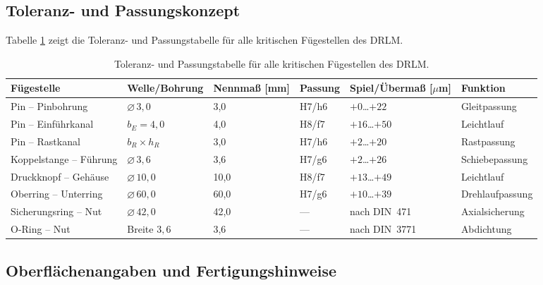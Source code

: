 ﻿\documentclass[12pt, a4paper]{article}
\theoremstyle{remark}
\begin{document}
\subsection{Toleranz- und Passungskonzept}
Tabelle \ref{tab:toleranzen} zeigt die Toleranz- und Passungstabelle für alle kritischen Fügestellen des DRLM.
\begin{table}
  \centering
  \caption{Toleranz- und Passungstabelle für alle kritischen Fügestellen des DRLM.}
  \label{tab:toleranzen}
  \renewcommand{\arraystretch}{1.35}
  \begin{tabular}{llllll}
    \toprule
    \textbf{Fügestelle} & \textbf{Welle/Bohrung} & \textbf{Nennmaß [mm]} &
    \textbf{Passung} & \textbf{Spiel/Übermaß [$\mu$m]} & \textbf{Funktion} \\
    \midrule
    Pin -- Pinbohrung         & $\varnothing\,3{,}0$ & 3{,}0  & H7/h6 & $+0$\ldots$+22$   & Gleitpassung \\
    Pin -- Einführkanal       & $b_E = 4{,}0$        & 4{,}0  & H8/f7 & $+16$\ldots$+50$  & Leichtlauf \\
    Pin -- Rastkanal          & $b_R \times h_R$     & 3{,}0  & H7/h6 & $+2$\ldots$+20$   & Rastpassung \\
    Koppelstange -- Führung   & $\varnothing\,3{,}6$ & 3{,}6  & H7/g6 & $+2$\ldots$+26$   & Schiebepassung \\
    Druckknopf -- Gehäuse     & $\varnothing\,10{,}0$& 10{,}0 & H8/f7 & $+13$\ldots$+49$  & Leichtlauf \\
    Oberring -- Unterring     & $\varnothing\,60{,}0$& 60{,}0 & H7/g6 & $+10$\ldots$+39$  & Drehlaufpassung \\
    Sicherungsring -- Nut     & $\varnothing\,42{,}0$& 42{,}0 & ---   & nach DIN~471       & Axialsicherung \\
    O-Ring -- Nut             & Breite $3{,}6$       & 3{,}6  & ---   & nach DIN~3771      & Abdichtung \\
    \bottomrule
  \end{tabular}
\end{table}

\subsection{Oberflächenangaben und Fertigungshinweise}
\end{document}

